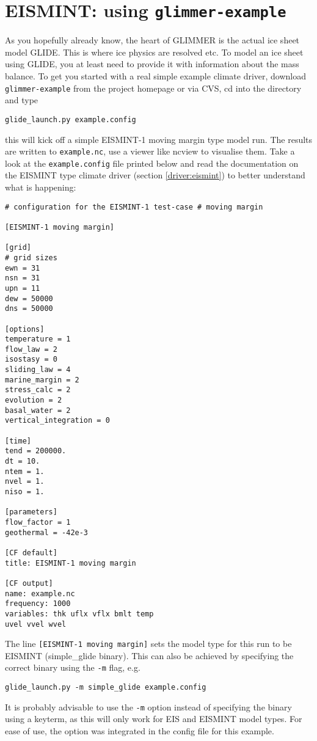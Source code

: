 
\section{EISMINT: using \texttt{glimmer-example}}
As you hopefully already know, the heart of GLIMMER is the actual ice sheet model
GLIDE. This is where ice physics are resolved etc. To model an ice sheet using
GLIDE, you at least need to provide it with information about the 
mass balance. To get you started with a real simple example climate driver,
download \texttt{glimmer-example} from the project homepage or via CVS, cd into
the directory and type
\begin{verbatim}
glide_launch.py example.config
\end{verbatim}
this will kick off a simple EISMINT-1 moving margin type model run. The results
are written to \texttt{example.nc}, use a viewer like ncview to visualise them.
Take a look at the \texttt{example.config} file printed below and read the documentation on
the EISMINT type climate driver (section \ref{driver:eismint}) to better understand what is happening:\\

\begin{verbatim}
# configuration for the EISMINT-1 test-case # moving margin

[EISMINT-1 moving margin]

[grid]
# grid sizes
ewn = 31
nsn = 31
upn = 11
dew = 50000
dns = 50000

[options]
temperature = 1
flow_law = 2
isostasy = 0
sliding_law = 4
marine_margin = 2
stress_calc = 2
evolution = 2
basal_water = 2
vertical_integration = 0

[time]
tend = 200000.
dt = 10.
ntem = 1.
nvel = 1.
niso = 1.

[parameters]
flow_factor = 1
geothermal = -42e-3

[CF default]
title: EISMINT-1 moving margin

[CF output]
name: example.nc
frequency: 1000
variables: thk uflx vflx bmlt temp
uvel vvel wvel
\end{verbatim}

The line \texttt{[EISMINT-1 moving margin]} sets the model type for this run to be EISMINT (simple_glide binary).
This can also be achieved by specifying the correct binary using the \texttt{-m} flag, e.g.
\begin{verbatim}
glide_launch.py -m simple_glide example.config
\end{verbatim}
It is probably advisable to use the \texttt{-m} option instead of specifying the binary using a 
keyterm, as this will only work for EIS and EISMINT model types. For ease of use, the option was integrated
in the config file for this example. 

